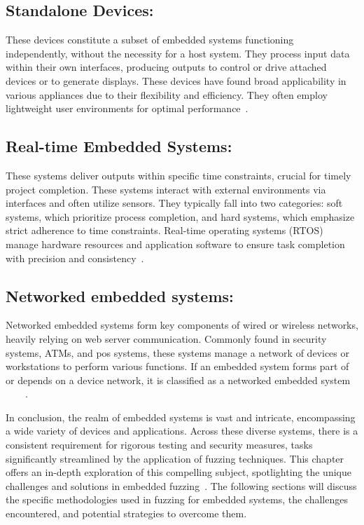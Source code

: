 \subsection*{Standalone Devices:}

These devices constitute a subset of embedded systems functioning
independently, without the necessity for a host system. They process input data
within their own interfaces, producing outputs to control or drive attached
devices or to generate displays. These devices have found broad applicability in
various appliances due to their flexibility and efficiency. They often employ
lightweight user environments for
optimal performance~\cite{yun2022fuzzing}\cite{WhatAreE30:online}\cite{TypesofE31:online}.

\subsection*{Real-time Embedded Systems:}
These systems deliver outputs within specific time constraints,
crucial for timely project completion. These systems interact with external
environments via interfaces and often utilize sensors. They typically fall into
two categories: soft systems, which prioritize process completion, and hard
systems, which emphasize strict adherence to time constraints. Real-time
operating systems (RTOS) manage hardware resources and application software to
ensure task completion with precision and
consistency~\cite{Introduc22:online}\cite{yun2022fuzzing}\cite{WhatAreE30:online}\cite{TypesofE31:online}.

\subsection*{Networked embedded systems:}
Networked embedded systems form key components of wired or wireless networks,
heavily relying on web server communication. Commonly found in security systems,
ATMs, and \acrlong{pos}\cite{WhatIsaP12:online} systems, these systems manage a network of devices or workstations
to perform various functions. If an embedded system forms part of or depends on a device network,
it is classified as a networked embedded
system ~\cite{Introduc22:online}~\cite{yun2022fuzzing}~\cite{WhatAreE30:online}~\cite{TypesofE31:online}.

In conclusion, the realm of embedded systems is vast and intricate,
encompassing a wide variety of devices and applications. Across these diverse
systems, there is a consistent requirement for rigorous testing and security
measures, tasks significantly streamlined by the application of fuzzing
techniques. This chapter offers an in-depth exploration of this compelling
subject, spotlighting the unique challenges and solutions in embedded
fuzzing~\cite{eisele2022embedded}. The following sections will discuss the
specific methodologies used in fuzzing for embedded systems, the challenges
encountered, and potential strategies to overcome them.



